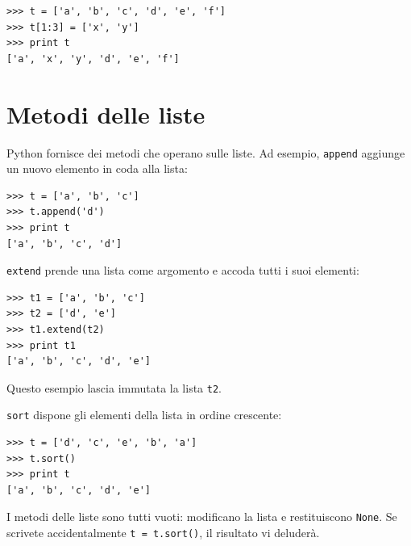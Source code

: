 \documentclass[10pt]{book}
\begin{document}
\begin{verbatim}
>>> t = ['a', 'b', 'c', 'd', 'e', 'f']
>>> t[1:3] = ['x', 'y']
>>> print t
['a', 'x', 'y', 'd', 'e', 'f']
\end{verbatim}
%


%

%


\section{Metodi delle liste}

Python fornisce dei metodi che operano sulle liste. Ad esempio,
{\tt append} aggiunge un nuovo elemento in coda alla lista:

\begin{verbatim}
>>> t = ['a', 'b', 'c']
>>> t.append('d')
>>> print t
['a', 'b', 'c', 'd']
\end{verbatim}
%
{\tt extend} prende una lista come argomento e accoda tutti i suoi elementi:

\begin{verbatim}
>>> t1 = ['a', 'b', 'c']
>>> t2 = ['d', 'e']
>>> t1.extend(t2)
>>> print t1
['a', 'b', 'c', 'd', 'e']
\end{verbatim}
%
Questo esempio lascia immutata la lista {\tt t2}.

{\tt sort} dispone gli elementi della lista in ordine crescente:

\begin{verbatim}
>>> t = ['d', 'c', 'e', 'b', 'a']
>>> t.sort()
>>> print t
['a', 'b', 'c', 'd', 'e']
\end{verbatim}
%
I metodi delle liste sono tutti vuoti: modificano la lista e restituiscono {\tt None}. Se scrivete accidentalmente  {\tt t = t.sort()}, il risultato vi deluderà.
\end{document}
